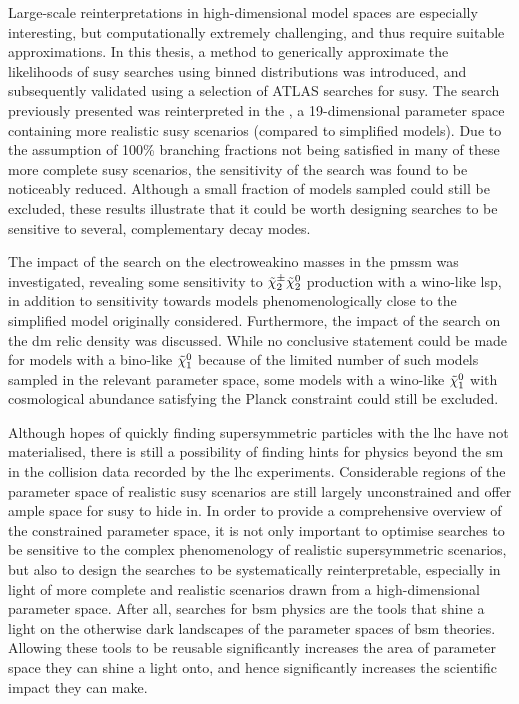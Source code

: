 Large-scale reinterpretations in high-dimensional model spaces are especially interesting, but computationally extremely challenging, and thus require suitable approximations. In this thesis, a method to generically approximate the likelihoods of \gls{susy} searches using binned distributions was introduced, and subsequently validated using a selection of ATLAS searches for \gls{susy}.
The search previously presented was reinterpreted in the , a 19-dimensional parameter space containing more realistic \gls{susy} scenarios (compared to simplified models). Due to the assumption of 100\% branching fractions not being satisfied in many of these more complete \gls{susy} scenarios, the sensitivity of the \onelepton search was found to be noticeably reduced. Although a small fraction of models sampled could still be excluded, these results illustrate that it could be worth designing searches to be sensitive to several, complementary decay modes.

The impact of the \onelepton search on the electroweakino masses in the \gls{pmssm} was investigated, revealing some sensitivity to $\tilde{\chi}_2^\pm\tilde{\chi}_2^0$ production with a wino-like \gls{lsp}, in addition to sensitivity towards models phenomenologically close to the simplified model originally considered. Furthermore, the impact of the \onelepton search on the \gls{dm} relic density was discussed.
While no conclusive statement could be made for models with a bino-like $\tilde{\chi}_1^0$ because of the limited number of such models sampled in the relevant parameter space, some models with a wino-like $\tilde{\chi}_1^0$ with cosmological abundance satisfying the Planck constraint could still be excluded. 
 
 Although hopes of quickly finding supersymmetric particles with the \gls{lhc} have not materialised, there is still a possibility of finding hints for physics beyond the \gls{sm} in the collision data recorded by the \gls{lhc} experiments.
 Considerable regions of the parameter space of realistic \gls{susy} scenarios are still largely unconstrained and offer ample space for \gls{susy} to hide in.
 In order to provide a comprehensive overview of the constrained parameter space, it is not only important to optimise searches to be sensitive to the complex phenomenology of realistic supersymmetric scenarios, but also to design the searches to be systematically reinterpretable, especially in light of more complete and realistic scenarios drawn from a high-dimensional parameter space.
 After all, searches for \gls{bsm} physics are the tools that shine a light on the otherwise dark landscapes of the parameter spaces of \gls{bsm} theories.
 Allowing these tools to be reusable significantly increases the area of parameter space they can shine a light onto, and hence significantly increases the scientific impact they can make.
 